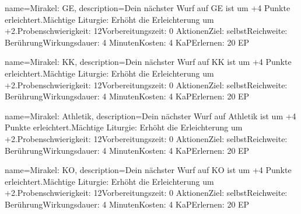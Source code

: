 {
    name={Mirakel: GE},
    description={Dein nächster Wurf auf GE ist um +4 Punkte erleichtert.\newline Mächtige Liturgie: Erhöht die Erleichterung um +2.\newline Probenschwierigkeit: 12\newline Vorbereitungszeit: 0 Aktionen\newline Ziel: selbst\newline Reichweite: Berührung\newline Wirkungsdauer: 4 Minuten\newline Kosten: 4 KaP\newline Erlernen: 20 EP}
}


{
    name={Mirakel: KK},
    description={Dein nächster Wurf auf KK ist um +4 Punkte erleichtert.\newline Mächtige Liturgie: Erhöht die Erleichterung um +2.\newline Probenschwierigkeit: 12\newline Vorbereitungszeit: 0 Aktionen\newline Ziel: selbst\newline Reichweite: Berührung\newline Wirkungsdauer: 4 Minuten\newline Kosten: 4 KaP\newline Erlernen: 20 EP}
}


{
    name={Mirakel: Athletik},
    description={Dein nächster Wurf auf Athletik ist um +4 Punkte erleichtert.\newline Mächtige Liturgie: Erhöht die Erleichterung um +2.\newline Probenschwierigkeit: 12\newline Vorbereitungszeit: 0 Aktionen\newline Ziel: selbst\newline Reichweite: Berührung\newline Wirkungsdauer: 4 Minuten\newline Kosten: 4 KaP\newline Erlernen: 20 EP}
}


{
    name={Mirakel: KO},
    description={Dein nächster Wurf auf KO ist um +4 Punkte erleichtert.\newline Mächtige Liturgie: Erhöht die Erleichterung um +2.\newline Probenschwierigkeit: 12\newline Vorbereitungszeit: 0 Aktionen\newline Ziel: selbst\newline Reichweite: Berührung\newline Wirkungsdauer: 4 Minuten\newline Kosten: 4 KaP\newline Erlernen: 20 EP}
}


